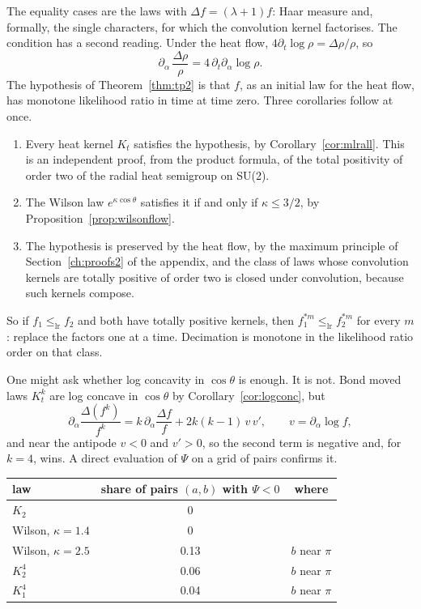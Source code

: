 The equality cases are the laws with $\Delta f=(\lambda+1)f$: Haar measure and, formally, the single characters, for which the convolution kernel factorises. The condition has a second reading. Under the heat flow, $4\partial_t\log\rho=\Delta\rho/\rho$, so
\[
\partial_\alpha\,\frac{\Delta\rho}{\rho}=4\,\partial_t\partial_\alpha\log\rho .
\]
The hypothesis of Theorem~\ref{thm:tp2} is that $f$, as an initial law for the heat flow, has monotone likelihood ratio in time at time zero. Three corollaries follow at once.

\begin{corollary}\label{cor:tp2}
\begin{enumerate}
\item[(i)] Every heat kernel $K_t$ satisfies the hypothesis, by Corollary~\ref{cor:mlrall}. This is an independent proof, from the product formula, of the total positivity of order two of the radial heat semigroup on SU(2).
\item[(ii)] The Wilson law $e^{\kappa\cos\theta}$ satisfies it if and only if $\kappa\le3/2$, by Proposition~\ref{prop:wilsonflow}.
\item[(iii)] The hypothesis is preserved by the heat flow, by the maximum principle of Section~\ref{ch:proofs2} of the appendix, and the class of laws whose convolution kernels are totally positive of order two is closed under convolution, because such kernels compose.
\end{enumerate}
\end{corollary}

So if $f_1\le_{\mathrm{lr}}f_2$ and both have totally positive kernels, then $f_1^{*m}\le_{\mathrm{lr}}f_2^{*m}$ for every $m$: replace the factors one at a time. Decimation is monotone in the likelihood ratio order on that class.

One might ask whether log concavity in $\cos\theta$ is enough. It is not. Bond moved laws $K_t^k$ are log concave in $\cos\theta$ by Corollary~\ref{cor:logconc}, but
\[
\partial_\alpha\frac{\Delta(f^k)}{f^k}=k\,\partial_\alpha\frac{\Delta f}{f}+2k(k-1)\,v\,v',\qquad v=\partial_\alpha\log f,
\]
and near the antipode $v<0$ and $v'>0$, so the second term is negative and, for $k=4$, wins. A direct evaluation of $\Psi$ on a grid of pairs confirms it.

\begin{center}
\small
\begin{tabular}{lcc}
\toprule
law & share of pairs $(a,b)$ with $\Psi<0$ & where \\ \midrule
$K_2$ & 0 & \\
Wilson, $\kappa=1.4$ & 0 & \\
Wilson, $\kappa=2.5$ & 0.13 & $b$ near $\pi$ \\
$K_2^4$ & 0.06 & $b$ near $\pi$ \\
$K_1^4$ & 0.04 & $b$ near $\pi$ \\
\bottomrule
\end{tabular}
\end{center}

